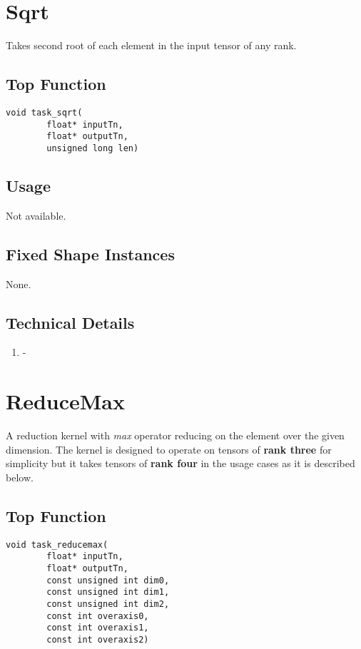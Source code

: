 \pagebreak





\section{Sqrt}
Takes second root of each element in the input tensor of any rank.

\subsection{Top Function}
\begin{lstlisting}
void task_sqrt(
        float* inputTn,
        float* outputTn,
        unsigned long len)
\end{lstlisting}

\subsection{Usage}
Not available.

\subsection{Fixed Shape Instances}
None.

\subsection{Technical Details}
\begin{enumerate}
\item -
\end{enumerate}






\pagebreak






\section{ReduceMax}
A reduction kernel with \textit{max} operator reducing on the element over the given dimension. The kernel is designed to operate on tensors of \textbf{rank three} for simplicity but it takes tensors of \textbf{rank four} in the usage cases as it is described below.
\subsection{Top Function}
\begin{lstlisting}
void task_reducemax(
        float* inputTn,
        float* outputTn,
		const unsigned int dim0,
		const unsigned int dim1,
		const unsigned int dim2,
		const int overaxis0,
		const int overaxis1,
		const int overaxis2)
\end{lstlisting}

